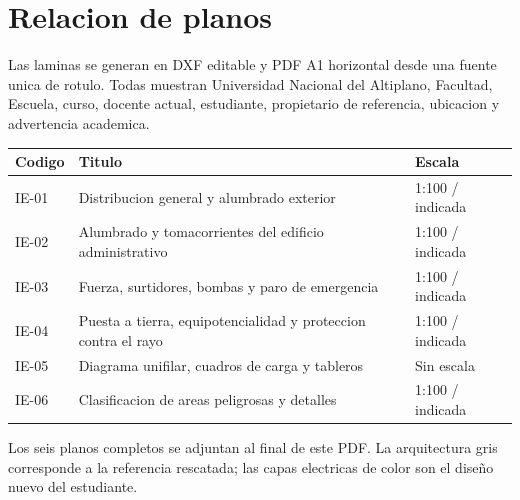 \chapter{Relacion de planos}
\thispagestyle{memoria}\pagestyle{memoria}

Las laminas se generan en DXF editable y PDF A1 horizontal desde una fuente unica de rotulo. Todas muestran Universidad Nacional del Altiplano, Facultad, Escuela, curso, docente actual, estudiante, propietario de referencia, ubicacion y advertencia academica.

\begin{tabularx}{\textwidth}{@{}p{1.4cm}L p{2.4cm}@{}}
\toprule Codigo & Titulo & Escala \\
\midrule
IE-01 & Distribucion general y alumbrado exterior & 1:100 / indicada \\
IE-02 & Alumbrado y tomacorrientes del edificio administrativo & 1:100 / indicada \\
IE-03 & Fuerza, surtidores, bombas y paro de emergencia & 1:100 / indicada \\
IE-04 & Puesta a tierra, equipotencialidad y proteccion contra el rayo & 1:100 / indicada \\
IE-05 & Diagrama unifilar, cuadros de carga y tableros & Sin escala \\
IE-06 & Clasificacion de areas peligrosas y detalles & 1:100 / indicada \\
\bottomrule
\end{tabularx}

Los seis planos completos se adjuntan al final de este PDF. La arquitectura gris corresponde a la referencia rescatada; las capas electricas de color son el diseño nuevo del estudiante.
